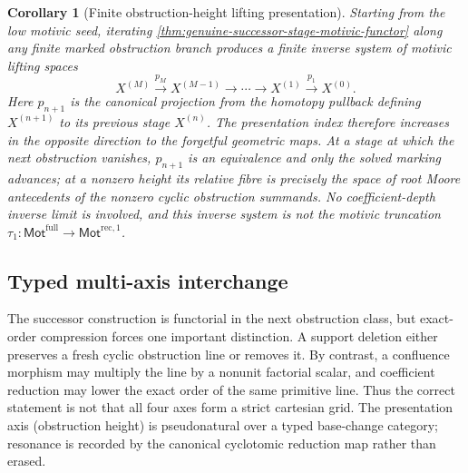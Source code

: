 \documentclass[11pt]{article}
\newtheorem{corollary}[theorem]{Corollary}
\theoremstyle{remark}
\providecommand{\RecOneMot}{\mathsf{Mot}^{\mathrm{rec},1}}
\providecommand{\FullMot}{\mathsf{Mot}^{\mathrm{full}}}
\providecommand{\tauone}{\tau_{1}}
\begin{document}
\begin{corollary}[Finite obstruction-height lifting presentation]
\label{cor:finite-recursive-motivic-height-tower}
Starting from the low motivic seed, iterating
\cref{thm:genuine-successor-stage-motivic-functor} along any finite marked obstruction
branch produces a finite inverse system of motivic lifting spaces
\[
 \boxed{
 X^{(M)}\xrightarrow{p_M}X^{(M-1)}\longrightarrow\cdots
 \longrightarrow X^{(1)}\xrightarrow{p_1}X^{(0)}.}
\]
Here $p_{n+1}$ is the canonical projection from the homotopy pullback defining
$X^{(n+1)}$ to its previous stage $X^{(n)}$.  The presentation index therefore
increases in the opposite direction to the forgetful geometric maps.  At a stage at
which the next obstruction vanishes, $p_{n+1}$ is an equivalence and only the solved marking
advances; at a nonzero height its relative fibre is precisely the space of root Moore
antecedents of the nonzero cyclic obstruction summands.  No coefficient-depth inverse
limit is involved, and this inverse system is not the motivic
truncation \(\tauone:\FullMot\to\RecOneMot\).
\end{corollary}

\subsection{Typed multi-axis interchange}

The successor construction is functorial in the next obstruction class, but exact-order
compression forces one important distinction.  A support deletion either preserves a
fresh cyclic obstruction line or removes it.  By contrast, a confluence morphism may
multiply the line by a nonunit factorial scalar, and coefficient reduction may lower the
exact order of the same primitive line.  Thus the correct statement is not that all four
axes form a strict cartesian grid.  The presentation axis (obstruction height) is
pseudonatural over a typed base-change category; resonance is recorded by the canonical
cyclotomic reduction map rather than erased.
\end{document}
